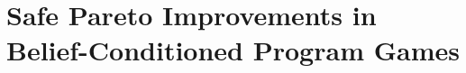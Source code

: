 \documentclass[sigconf]{aamas}
\theoremstyle{definition}
\begin{document}
\pagestyle{fancy}
\fancyhead{}

\twocolumn



\section{Safe Pareto Improvements in Belief-Conditioned Program Games}\label{sec:bcpg}

%
\end{document}
